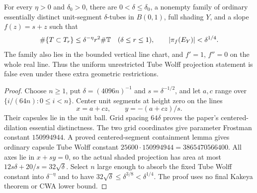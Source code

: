 \begin{theorem}
\label{thm:twisted-offset-obstruction}
\leanok
{}
For every $\eta>0$ and $\delta_0>0$, there are
$0<\delta\leq\delta_0$, a nonempty family of ordinary essentially distinct
unit-segment $\delta$-tubes in $B(0,1)$, full shading $Y$, and a slope
$f(z)=s+z$ such that
\[
  \#\{T\subset T_r\}\leq\delta^{-\eta}r^2\#\mathbb{T}
       \quad(\delta\leq r\leq1),
  \qquad |\pi_f(E_Y)|<\delta^{1/4}.
\]
The family also lies in the bounded vertical line chart, and
$f'=1$, $f''=0$ on the whole real line. Thus the uniform unrestricted
Tube Wolff projection statement is false even under these extra
geometric restrictions.
\end{theorem}
\begin{proof}
\leanok
Choose $n\geq1$, put $\delta=(4096n)^{-1}$ and
$s=\delta^{-1/2}$, and let $a,c$ range over
$\{i/(64n):0\leq i<n\}$. Center unit segments at height zero on the lines
\[
  x=a+cz,\qquad y=-(a+cz)/s.
\]
Their capsules lie in the unit ball. Grid spacing $64\delta$ proves
the paper's centered-dilation essential distinctness. The two grid
coordinates give parameter Frostman constant $150994944$. A proved
centered-segment containment lemma gives ordinary capsule Tube Wolff
constant $25600\cdot150994944=3865470566400$.
All axes lie in $x+sy=0$, so the actual shaded projection has area at most
$12s\delta+20/s=32\sqrt\delta$. Select $n$ large enough to absorb the
fixed Tube Wolff constant into $\delta^{-\eta}$ and to have
$32\sqrt\delta\leq\delta^{3/8}<\delta^{1/4}$.
The proof uses no final Kakeya theorem or CWA lower bound.
\end{proof}

